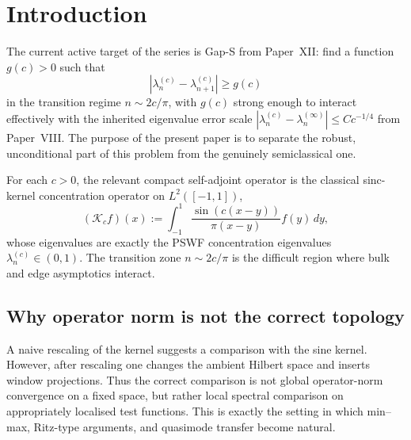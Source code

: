 \documentclass[12pt,a4paper]{amsart}
\theoremstyle{definition}
\theoremstyle{remark}
\newcommand{\Kc}{\mathcal{K}_c}
\newcommand{\lambdac}[2]{\lambda_{#2}^{(#1)}}
\begin{document}
\maketitle

\section{Introduction}
\label{sec:intro}

The current active target of the series is Gap-S from Paper~XII:
find a function $g(c)>0$ such that
\begin{equation}\label{eq:gapS}
  |\lambdac{c}{n}-\lambdac{c}{n+1}| \ge g(c)
\end{equation}
in the transition regime $n\sim 2c/\pi$, with $g(c)$ strong enough to
interact effectively with the inherited eigenvalue error scale
$|\lambdac{c}{n}-\lambda_n^{(\infty)}|\le Cc^{-1/4}$ from Paper~VIII.
The purpose of the present paper is to separate the robust, unconditional
part of this problem from the genuinely semiclassical one.

For each $c>0$, the relevant compact self-adjoint operator is the classical
sinc-kernel concentration operator on $L^2([-1,1])$,
\begin{equation}\label{eq:sinc-kernel}
  (\Kc f)(x)
  := \int_{-1}^1 \frac{\sin(c(x-y))}{\pi(x-y)} f(y)\,dy,
\end{equation}
whose eigenvalues are exactly the PSWF concentration eigenvalues
$\lambdac{c}{n}\in(0,1)$.
The transition zone $n\sim 2c/\pi$ is the difficult region where bulk and
edge asymptotics interact.

\begin{center}
\end{center}

\subsection{Why operator norm is not the correct topology}

A naive rescaling of the kernel suggests a comparison with the sine kernel.
However, after rescaling one changes the ambient Hilbert space and inserts
window projections.
Thus the correct comparison is not global operator-norm convergence on a
fixed space, but rather local spectral comparison on appropriately
localised test functions.
This is exactly the setting in which min--max, Ritz-type arguments,
and quasimode transfer become natural.
\end{document}
